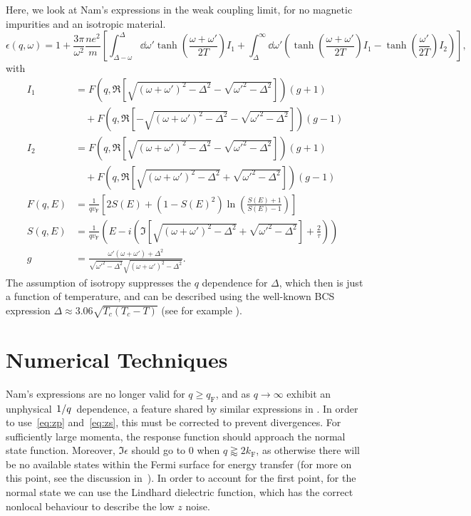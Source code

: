 \documentclass{article}
\newcommand{\vf}{v_{\mathrm{F}}}
\begin{document}
Here, we look at Nam's expressions in the weak coupling limit, for no magnetic impurities and an isotropic material.
\begin{equation}
	\epsilon(q, \omega) = 1 + \frac{3 \pi}{\omega^2} \frac{n e^2}{m} \left[\int_{\Delta - \omega}^{\Delta}\dd{\omega'} \tanh(\frac{\omega + \omega'}{2 T}) I_1 + \int_{\Delta}^{\infty} \dd{\omega'} \left( \tanh(\frac{\omega + \omega'}{2 T}) I_1  - \tanh(\frac{\omega'}{2 T})I_2 \right) \right], \label{eq:eps}
\end{equation}
with
\begin{align}
	I_1 &= F(q, \Re[\sqrt{(\omega + \omega')^2 - \Delta^2} - \sqrt{\omega'^2 - \Delta^2}]) (g + 1) \nonumber\\
	&\quad + F(q, \Re[-\sqrt{(\omega + \omega')^2 - \Delta^2} - \sqrt{\omega'^2 - \Delta^2}]) (g - 1) \\
	I_2 &= F(q, \Re[\sqrt{(\omega + \omega')^2 - \Delta^2} - \sqrt{\omega'^2 - \Delta^2}]) (g + 1) \nonumber\\
	&\quad + F(q, \Re[\sqrt{(\omega +  \omega')^2 - \Delta^2} + \sqrt{\omega'^2 - \Delta^2}]) (g - 1) \\
	F(q, E) &= \frac{1}{q \vf} \left[2 S(E) + (1 - S(E)^2)\ln(\frac{S(E) + 1}{S(E) - 1})\right]  \\
	S(q, E) &= \frac{1}{q \vf} \left( E - i \left(\Im[\sqrt{(\omega + \omega')^2 - \Delta^2} + \sqrt{\omega'^2 - \Delta^2}] + \frac{2}{\tau} \right) \right) \\
	g &= \frac{\omega' \left(\omega + \omega'\right) + \Delta^2}{\sqrt{\omega'^2 - \Delta^2}\sqrt{(\omega + \omega')^2 - \Delta^2}}.
\end{align}
The assumption of isotropy suppresses the $q$ dependence for $\Delta$, which then is just a function of temperature, and can be described using the well-known BCS expression $\Delta \approx 3.06 \sqrt{T_c(T_c - T)}$ (see for example \cite{Tinkham}).

\section{Numerical Techniques \label{sec:technical}}

	Nam's expressions are no longer valid for $q \geq q_\mathrm{F}$, and as $q \rightarrow \infty$ exhibit an unphysical $\flatfrac{1}{q}$ dependence, a feature shared by similar expressions in \cite{AGD}.
	In order to use~\eqref{eq:zp} and~\eqref{eq:zs}, this must be corrected to prevent divergences.
	For sufficiently large momenta, the response function should approach the normal state function.
	Moreover, $\Im \epsilon$ should go to $0$ when $q \gtrapprox 2 k_{\mathrm{F}}$, as otherwise there will be no available states within the Fermi surface for energy transfer (for more on this point, see the discussion in~\cite{FetterWalecka}).
	In order to account for the first point, for the normal state we can use the Lindhard dielectric function, which has the correct nonlocal behaviour to describe the low $z$ noise\cite{QubitRelax}.
\end{document}
